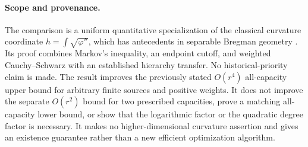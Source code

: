 \paragraph{Scope and provenance.}
The comparison is a uniform quantitative specialization of the classical
curvature coordinate $h=\int\sqrt{\varphi''}$, which has antecedents in
separable Bregman geometry \cite{gomes,gzyl}. Its proof combines Markov's
inequality, an endpoint cutoff, and weighted Cauchy--Schwarz with an
established hierarchy transfer. No historical-priority claim is made.
The result improves the previously stated $O(r^4)$ all-capacity upper bound
for arbitrary finite sources and positive weights. It does not improve the
separate $O(r^2)$ bound for two prescribed capacities, prove a matching
all-capacity lower bound, or show that the logarithmic factor or the
quadratic degree factor is necessary. It makes no higher-dimensional
curvature assertion and gives an existence guarantee rather than a new
efficient optimization algorithm.
